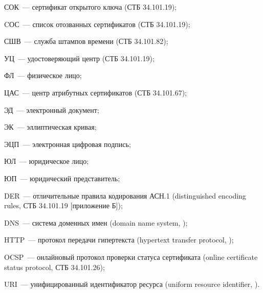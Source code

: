 СОК~--- сертификат открытого ключа (СТБ 34.101.19);

CОС~--- список отозванных сертификатов (СТБ 34.101.19);

СШВ~--- служба штампов времени (СТБ 34.101.82);

УЦ~--- удостоверяющий центр (СТБ 34.101.19);

ФЛ~--- физическое лицо;

ЦАС~--- центр атрибутных сертификатов (СТБ 34.101.67);

ЭД~--- электронный документ;

ЭК~--- эллиптическая кривая;

ЭЦП~--- электронная цифровая подпись;

ЮЛ~--- юридическое лицо;

ЮП~--- юридический представитель;

DER~--- отличительные правила кодирования АСН.1
(distinguished encoding rules, СТБ 34.101.19 [приложение Б]);

DNS~--- система доменных имен (domain name system, \cite{DNS});

HTTP~--- протокол передачи гипертекста 
(hypertext transfer protocol, \cite{HTTP});

OCSP~--- онлайновый протокол проверки статуса сертификата
(online certificate status protocol, СТБ 34.101.26);

URI~--- унифицированный идентификатор ресурса 
(uniform resource identifier, \cite{URI}).

